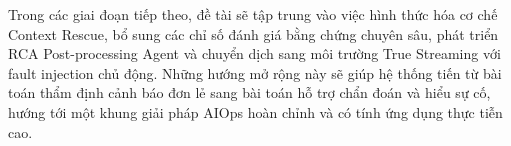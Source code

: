 Trong các giai đoạn tiếp theo, đề tài sẽ tập trung vào việc hình thức hóa cơ chế Context Rescue, bổ sung các chỉ số đánh giá bằng chứng chuyên sâu, phát triển RCA Post-processing Agent và chuyển dịch sang môi trường True Streaming với fault injection chủ động. Những hướng mở rộng này sẽ giúp hệ thống tiến từ bài toán thẩm định cảnh báo đơn lẻ sang bài toán hỗ trợ chẩn đoán và hiểu sự cố, hướng tới một khung giải pháp AIOps hoàn chỉnh và có tính ứng dụng thực tiễn cao.
